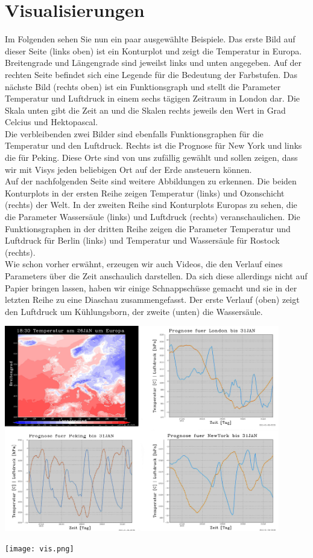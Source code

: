 \documentclass[a4paper,oneside,12pt,titlepage]{article}
\begin{document}
\section{Visualisierungen}
Im Folgenden sehen Sie nun ein paar ausgewählte Beispiele. Das erste Bild auf dieser Seite (links oben) ist ein Konturplot und zeigt die Temperatur in Europa. Breitengrade und Längengrade sind jeweilst links und unten angegeben. Auf der rechten Seite befindet sich eine Legende für die Bedeutung der Farbstufen. Das nächste Bild (rechts oben) ist ein Funktionsgraph und stellt die Parameter Temperatur und Luftdruck in einem sechs tägigen Zeitraum in London dar. Die Skala unten gibt die Zeit an und die Skalen rechts jeweils den Wert in Grad Celcius und Hektopascal.\\
Die verbleibenden zwei Bilder sind ebenfalls Funktionsgraphen für die Temperatur und den Luftdruck. Rechts ist die Prognose für New York und links die für Peking. Diese Orte sind von uns zufällig gewählt und sollen zeigen, dass wir mit Visys jeden beliebigen Ort auf der Erde ansteuern können.\\
Auf der nachfolgenden Seite sind weitere Abbildungen zu erkennen. Die beiden Konturplots in der ersten Reihe zeigen Temperatur (links) und Ozonschicht (rechts) der Welt.
In der zweiten Reihe sind Konturplots Europas zu sehen, die die Parameter Wassersäule (links) und Luftdruck (rechts) veranschaulichen.
Die Funktionsgraphen in der dritten Reihe zeigen die Parameter Temperatur und Luftdruck für Berlin (links) und Temperatur und Wassersäule für Rostock (rechts).\\
Wie schon vorher erwähnt, erzeugen wir auch Videos, die den Verlauf eines Parameters über die Zeit anschaulich darstellen. Da sich diese allerdings nicht auf Papier bringen lassen, haben wir einige Schnappschüsse gemacht und sie in der letzten Reihe zu eine Diaschau zusammengefasst. Der erste Verlauf (oben) zeigt den Luftdruck um Kühlungsborn, der zweite (unten) die Wassersäule.
\begin{center}
\includegraphics[width=0.9\textwidth, height=0.434\textheight]{vis1.png} 
\end{center}
\newpage
\begin{center}
\texttt{[image: vis.png]} 
\end{center}
\end{document}
